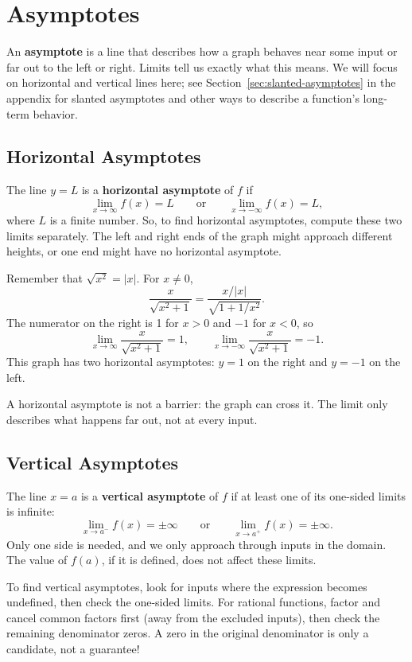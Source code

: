 \section{Asymptotes}
\label{sec:asymptotes}

An \textbf{asymptote} is a line that describes how a graph behaves near
some input or far out to the left or right. Limits tell us exactly what
this means. We will focus on horizontal and vertical lines here; see
Section~\ref{sec:slanted-asymptotes} in the appendix for slanted asymptotes
and other ways to describe a function's long-term behavior.

\subsection{Horizontal Asymptotes}

The line $y=L$ is a \textbf{horizontal asymptote} of $f$ if
$$\lim_{x\to\infty}f(x)=L\qquad\text{or}\qquad
\lim_{x\to-\infty}f(x)=L,$$
where $L$ is a finite number. So, to find horizontal asymptotes, compute
these two limits separately. The left and right ends of the graph might
approach different heights, or one end might have no horizontal asymptote.

\begin{exampleblock}
Remember that $\sqrt{x^2}=|x|$. For $x\ne0$,
$$\frac{x}{\sqrt{x^2+1}}=
\frac{x/|x|}{\sqrt{1+1/x^2}}.$$
The numerator on the right is 1 for $x>0$ and $-1$ for $x<0$, so
$$\lim_{x\to\infty}\frac{x}{\sqrt{x^2+1}}=1,
\qquad
\lim_{x\to-\infty}\frac{x}{\sqrt{x^2+1}}=-1.$$
This graph has two horizontal asymptotes: $y=1$ on the right and $y=-1$
on the left.
\end{exampleblock}

A horizontal asymptote is not a barrier: the graph can cross it.
The limit only describes what happens far out, not at every input.

\subsection{Vertical Asymptotes}

The line $x=a$ is a \textbf{vertical asymptote} of $f$ if at least one
of its one-sided limits is infinite:
$$\lim_{x\to a^-}f(x)=\pm\infty\qquad\text{or}\qquad
\lim_{x\to a^+}f(x)=\pm\infty.$$
Only one side is needed, and we only approach through inputs in the
domain. The value of $f(a)$, if it is defined, does not affect these limits.

To find vertical asymptotes, look for inputs where the expression becomes
undefined, then check the one-sided limits. For rational functions, factor
and cancel common factors first (away from the excluded inputs), then
check the remaining denominator zeros. A zero in the original denominator
is only a candidate, not a guarantee!

